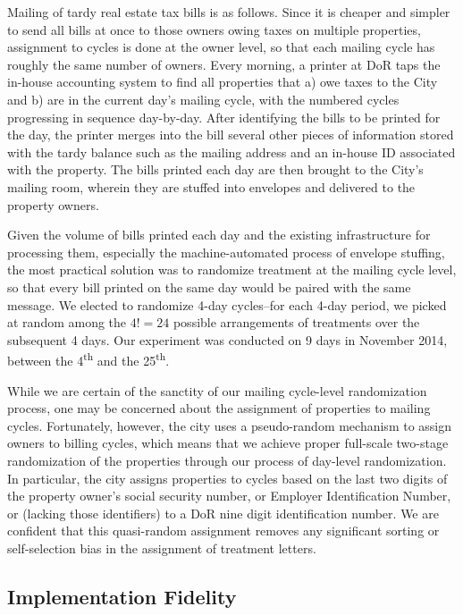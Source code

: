\documentclass[12pt,titlepage]{article}
\begin{document}
Mailing of tardy real estate tax bills is as follows.
Since it is cheaper and simpler to send all bills at once to those
owners owing taxes on multiple properties, assignment to cycles is
done at the owner level, so that each mailing cycle has roughly the
same number of owners.  Every morning, a printer at DoR taps the
in-house accounting system to find all properties that a) owe taxes to
the City and b) are in the current day's mailing cycle, with the
numbered cycles progressing in sequence day-by-day.  After identifying
the bills to be printed for the day, the printer merges into the bill
several other pieces of information stored with the tardy balance such
as the mailing address and an in-house ID associated with the
property. The bills printed each day are then
brought to the City's mailing room, wherein they are stuffed into
envelopes and delivered to the property owners.

Given the volume of bills printed each day and the existing
infrastructure for processing them, especially the machine-automated
process of envelope stuffing, the most practical solution was to
randomize treatment at the mailing cycle level, so that every bill
printed on the same day would be paired with the same message.  We
elected to randomize 4-day cycles--for each 4-day period, we picked at
random among the $4!=24$ possible arrangements of treatments over the
subsequent 4 days. Our experiment was conducted on 9 days in November
2014, between the 4\textsuperscript{th} and the
25\textsuperscript{th}.

While we are certain of the sanctity of our mailing cycle-level
randomization process, one may be concerned about the assignment of
properties to mailing cycles. Fortunately, however, the city uses a
pseudo-random mechanism to assign owners to billing cycles, which
means that we achieve proper full-scale two-stage randomization of the
properties through our process of day-level randomization. In
particular, the city assigns properties to cycles based on the last
two digits of the property owner's social security number, or Employer
Identification Number, or (lacking those identifiers) to a DoR nine
digit identification number.  We are confident that this quasi-random
assignment removes any significant sorting or self-selection bias in
the assignment of treatment letters.


\subsection{Implementation Fidelity}
\end{document}
